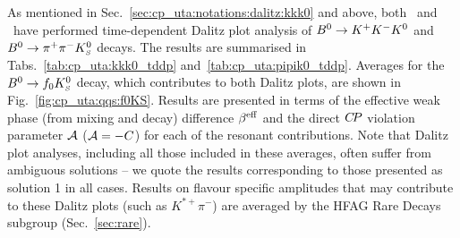 \label{sec:cp_uta:qqs:dp}

As mentioned in Sec.~\ref{sec:cp_uta:notations:dalitz:kkk0} and above,
both \babar\ and \belle\ have performed time-dependent Dalitz plot analysis of
$B^0 \to K^+K^-K^0$ and $B^0 \to \pi^+\pi^-K^0_{\scriptscriptstyle S}$ decays.
The results are summarised in Tabs.~\ref{tab:cp_uta:kkk0_tddp} 
and~\ref{tab:cp_uta:pipik0_tddp}.
Averages for the $B^0\to f_0 K^0_{\scriptscriptstyle S}$ decay, which contributes to both Dalitz
plots, are shown in Fig.~\ref{fig:cp_uta:qqs:f0KS}.
Results are presented in terms of the effective weak phase (from mixing and
decay) difference $\beta^{\rm eff}$ and the direct $C\!P$ violation parameter
${\cal A}$ (${\cal A} = -C$) for each of the resonant contributions.
Note that Dalitz plot analyses, including all those included in these
averages, often suffer from ambiguous solutions -- we quote the results
corresponding to those presented as solution 1 in all cases.
Results on flavour specific amplitudes that may contribute to these Dalitz
plots (such as $K^{*+}\pi^-$) are averaged by the HFAG Rare Decays subgroup 
(Sec.~\ref{sec:rare}).





